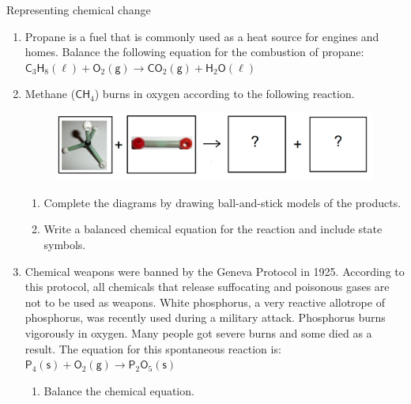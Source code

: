            \begin{eocexercises}{Representing chemical change}
            \nopagebreak
      \label{m38727*id67334}\begin{enumerate}[noitemsep, label=\textbf{\arabic*}. ] 
\label{m38727*uid45}\item Propane is a fuel that is commonly used as a heat source for engines and homes. Balance the following equation for the combustion of propane:
${\mathsf{C}}_{3}{\mathsf{H}}_{8} \mathsf{(\ell)} + \mathsf{O}_{2} \mathsf{(g)} \to \mathsf{CO}_{2} \mathsf{(g)} + \mathsf{H}_{2}\mathsf{O} \mathsf{(\ell)}$
        \label{m38727*uid47}\item Methane ($\mathsf{CH}_{4}$) burns in oxygen according to the following reaction. \\
\begin{figure}[H]
\begin{center}
 \includegraphics[width=.8\textwidth]{photos/methane_O2_rxn.png}
\end{center}
\end{figure}
\begin{enumerate}[noitemsep, label=\textbf{\alph*}.]
 \item Complete the diagrams by drawing ball-and-stick models of the products.
\item Write a balanced chemical equation for the reaction and include state symbols.
\end{enumerate}
 \label{m38727*uid48}\item Chemical weapons were banned by the Geneva Protocol in 1925. According to this protocol, all chemicals that release suffocating and poisonous gases are not to be used as weapons. White phosphorus, a very reactive allotrope of phosphorus, was recently used during a military attack. Phosphorus burns vigorously in oxygen. Many people got severe burns and some died as a result. The equation for this spontaneous reaction is:
        ${\mathsf{P}}_{4}\left(\mathsf{s}\right)+{\mathsf{O}}_{2}\left(\mathsf{g}\right)\to {\mathsf{P}}_{2}{\mathsf{O}}_{5}\left(\mathsf{s}\right)$\label{m38727*id67821}\begin{enumerate}[noitemsep, label=\textbf{\alph*}. ] 
            \label{m38727*uid49}\item Balance the chemical equation.

\end{enumerate}
\end{enumerate}
\end{eocexercises}
